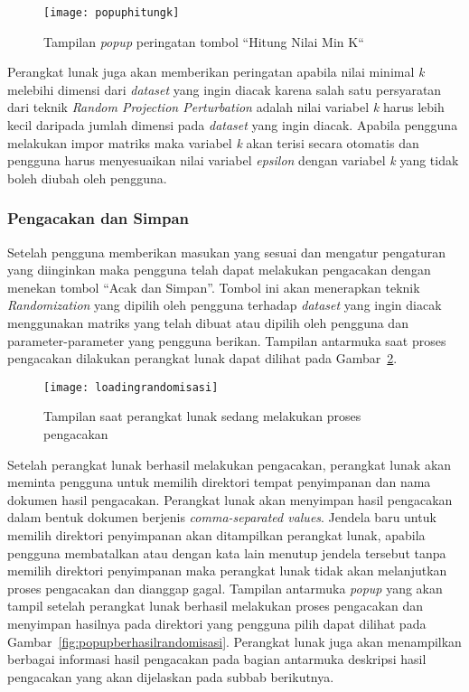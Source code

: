 \begin{figure}
	\centering
	\texttt{[image: popuphitungk]}
	\caption{Tampilan \textit{popup} peringatan tombol \textquotedblleft Hitung Nilai Min K\textquotedblleft }
	\label{fig:popuphitungk}
\end{figure}

Perangkat lunak juga akan memberikan peringatan apabila nilai minimal \textit{k} melebihi dimensi dari \textit{dataset} yang ingin diacak karena salah satu persyaratan dari teknik \textit{Random Projection Perturbation} adalah nilai variabel \textit{k} harus lebih kecil daripada jumlah dimensi pada \textit{dataset} yang ingin diacak. Apabila pengguna melakukan impor matriks maka variabel \textit{k} akan terisi secara otomatis dan pengguna harus menyesuaikan nilai variabel \textit{epsilon} dengan variabel \textit{k} yang tidak boleh diubah oleh pengguna. 

\subsubsection{Pengacakan dan Simpan}
\label{subsubsec:randomisasisimpan}

Setelah pengguna memberikan masukan yang sesuai dan mengatur pengaturan yang diinginkan maka pengguna telah dapat melakukan pengacakan dengan menekan tombol \textquotedblleft Acak dan Simpan\textquotedblright. Tombol ini akan menerapkan teknik \textit{Randomization} yang dipilih oleh pengguna terhadap \textit{dataset} yang ingin diacak menggunakan matriks yang telah dibuat atau dipilih oleh pengguna dan parameter-parameter yang pengguna berikan. Tampilan antarmuka saat proses pengacakan dilakukan perangkat lunak dapat dilihat pada Gambar~\ref{fig:loadingrandomisasi}.

\begin{figure}
	\centering
	\texttt{[image: loadingrandomisasi]}
	\caption{Tampilan saat perangkat lunak sedang melakukan proses pengacakan}
	\label{fig:loadingrandomisasi}
\end{figure}

Setelah perangkat lunak berhasil melakukan pengacakan, perangkat lunak akan meminta pengguna untuk memilih direktori tempat penyimpanan dan nama dokumen hasil pengacakan. Perangkat lunak akan menyimpan hasil pengacakan dalam bentuk dokumen berjenis \textit{comma-separated values}. Jendela baru untuk memilih direktori penyimpanan akan ditampilkan perangkat lunak, apabila pengguna membatalkan atau dengan kata lain menutup jendela tersebut tanpa memilih direktori penyimpanan maka perangkat lunak tidak akan melanjutkan proses pengacakan dan dianggap gagal. Tampilan antarmuka \textit{popup} yang akan tampil setelah perangkat lunak berhasil melakukan proses pengacakan dan menyimpan hasilnya pada direktori yang pengguna pilih dapat dilihat pada Gambar~\ref{fig:popupberhasilrandomisasi}. Perangkat lunak juga akan menampilkan berbagai informasi hasil pengacakan pada bagian antarmuka deskripsi hasil pengacakan yang akan dijelaskan pada subbab berikutnya.

